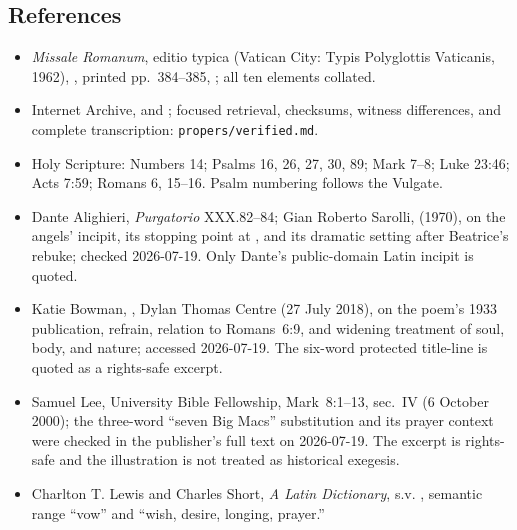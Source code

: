 \begin{deepstudy}
\section*{References}
{\footnotesize
\begin{itemize}[itemsep=0em,topsep=0.15em,parsep=0pt]
\item \emph{Missale Romanum}, editio typica (Vatican City: Typis Polyglottis Vaticanis, 1962), , printed pp.~384--385, ; all ten elements collated.
\item Internet Archive,  and ; focused retrieval, checksums, witness differences, and complete transcription: \nolinkurl{propers/verified.md}.
\item Holy Scripture: Numbers 14; Psalms 16, 26, 27, 30, 89; Mark 7--8; Luke 23:46; Acts 7:59; Romans 6, 15--16. Psalm numbering follows the Vulgate.
\item Dante Alighieri, \emph{Purgatorio} XXX.82--84; Gian Roberto Sarolli,  (1970), on the angels' incipit, its stopping point at , and its dramatic setting after Beatrice's rebuke; checked 2026-07-19. Only Dante's public-domain Latin incipit is quoted.
\item Katie Bowman, , Dylan Thomas Centre (27 July 2018), on the poem's 1933 publication, refrain, relation to Romans~6:9, and widening treatment of soul, body, and nature; accessed 2026-07-19. The six-word protected title-line is quoted as a rights-safe excerpt.
\item Samuel Lee,  University Bible Fellowship, Mark~8:1--13, sec.~IV (6 October 2000); the three-word ``seven Big Macs'' substitution and its prayer context were checked in the publisher's full text on 2026-07-19. The excerpt is rights-safe and the illustration is not treated as historical exegesis.
\item Charlton T. Lewis and Charles Short, \emph{A Latin Dictionary}, s.v. , semantic range ``vow'' and ``wish, desire, longing, prayer.''

\end{itemize}}
\end{deepstudy}
